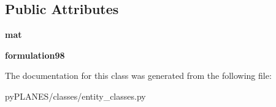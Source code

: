 \subsection*{Public Attributes}
\begin{DoxyCompactItemize}
\item 
\mbox{\label{classpy_p_l_a_n_e_s_1_1classes_1_1entity__classes_1_1_pem_fem_a905224aeca7b1ce94895db41b2609cf0}} 
{\bfseries mat}
\item 
\mbox{\label{classpy_p_l_a_n_e_s_1_1classes_1_1entity__classes_1_1_pem_fem_a6ece1d38a0723e4be3f5d264eac57a29}} 
{\bfseries formulation98}
\end{DoxyCompactItemize}


The documentation for this class was generated from the following file\+:\begin{DoxyCompactItemize}
\item 
py\+P\+L\+A\+N\+E\+S/classes/entity\+\_\+classes.\+py\end{DoxyCompactItemize}
